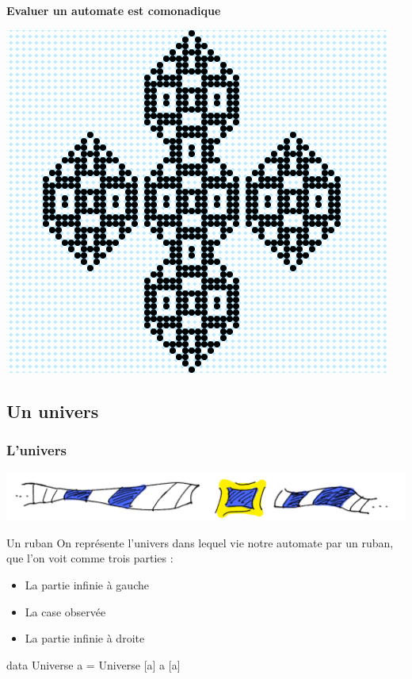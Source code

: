 \documentclass{beamer}
\begin{document}
\begin{frame}
\begin{center}
\textbf{ Evaluer un automate est comonadique }
\end{center}
\begin{center}
\includegraphics[scale=0.5]{automata_flip.png}
\end{center}
\end{frame}

\subsection{Un univers}
\begin{frame}
\frametitle{L'univers}
\begin{center}
\includegraphics[scale=0.23]{ribbon_struct.png}
\end{center}

\begin{block}{Un ruban}
On représente l'univers dans lequel vie notre automate par un ruban, que l'on voit comme trois parties :

\begin{itemize}
\item La partie infinie à gauche
\item La case observée
\item La partie infinie à droite
\end{itemize}
\end{block}

\begin{block}{}
data Universe a = Universe [a] a [a]
\end{block}
\end{frame}
\end{document}
